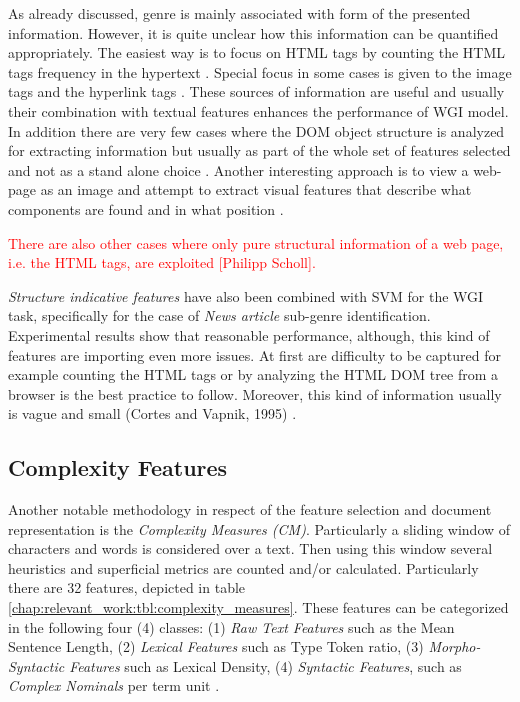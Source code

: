 As already discussed, genre is mainly associated with form of the presented information. However, it is quite unclear how this information can be quantified appropriately. The easiest way is to focus on HTML tags by counting the HTML tags frequency in the hypertext . Special focus in some cases is given to the image tags and the hyperlink tags \parencite{Lim2005,levering2008using}. These sources of information are useful and usually their combination with textual features enhances the performance of
WGI model. In addition there are very few cases where the DOM object structure is analyzed for extracting information but usually as part of the whole set of features selected and not as a stand alone choice \parencite{mehler2011integrating}. Another interesting approach is to view a web-page as an image and attempt to extract visual features that describe what components are found and in what position .

\textcolor{red}{There are also other cases where only pure structural information of a web page, i.e. the HTML tags, are exploited {[}Philipp Scholl{]}.} 

\textit{Structure indicative features} have also been combined with SVM for the WGI task, specifically for the case of \textit{News article} sub-genre identification. Experimental results show that reasonable performance, although, this kind of features are importing even more issues. At first are difficulty to be captured for example counting the HTML tags or by analyzing the HTML DOM tree from a browser is the best practice to follow. Moreover, this kind of information usually is vague and small (Cortes and Vapnik, 1995) .


\subsection{Complexity Features}

Another notable methodology in respect of the feature selection and document representation is the \textit{Complexity Measures (CM)}. Particularly a sliding window of characters and words is considered over a text. Then using this window several heuristics and superficial metrics are counted and/or calculated. Particularly there are 32 features, depicted in table \ref{chap:relevant_work:tbl:complexity_measures}. These features can be categorized in the following four (4) classes: (1) \textit{Raw Text Features} such as the Mean Sentence Length, (2) \textit{Lexical Features} such as Type Token ratio, (3) \textit{Morpho-Syntactic Features} such as Lexical Density, (4) \textit{Syntactic Features}, such as \textit{Complex Nominals} per term unit \parencite{strobel2018text}.

